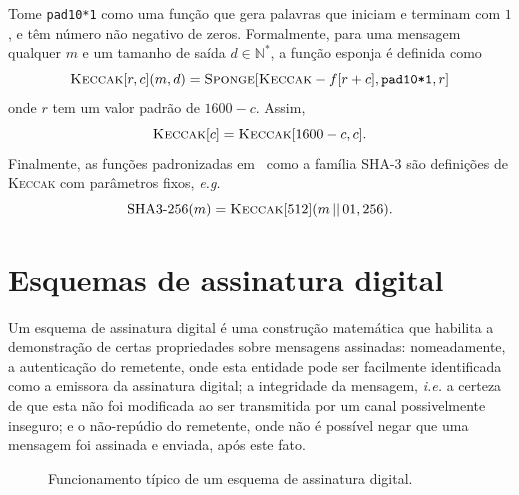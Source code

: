 \documentclass{ufsctex/ufsctex}
\newcommand{\pk}{\mathcal{P}_k}
\newcommand{\sk}{\mathcal{S}_k}
\newcommand{\concat}{\, \vert{} \vert{} \,}
\newcommand{\binwds}[1]{\{0, 1\}^{#1}}
\begin{document}
Tome \texttt{pad10*1} como uma função que gera palavras que iniciam e terminam
com $1$, e têm número não negativo de zeros. Formalmente, para uma mensagem
qualquer $m$ e um tamanho de saída $d \in \mathbb{N}^{*}$, a função esponja é
definida como
\begin{equation}
  \textsc{Keccak}[r, c](m, d)
    = \textsc{Sponge}[\textsc{Keccak}-f[r + c], \texttt{pad10*1}, r]
\end{equation}
onde $r$ tem um valor padrão de $1600 - c$. Assim,
\begin{equation}
  \textsc{Keccak}[c] = \textsc{Keccak}[1600 - c, c].
\end{equation}
Finalmente, as funções padronizadas em~\cite{Dworkin2015} como a família SHA-3
são definições de \textsc{Keccak} com parâmetros fixos, \emph{e.g.}
\begin{equation}
  \text{SHA3-}256(m) = \textsc{Keccak}[512](m \concat 01, 256).
\end{equation}\simbolo{$\concat$}{Concatenação de palavras}

\section{Esquemas de assinatura digital}\label{section:digitalsig}

Um esquema de assinatura digital é uma construção matemática que habilita a
demonstração de certas propriedades sobre mensagens assinadas: nomeadamente, a
autenticação do remetente, onde esta entidade pode ser facilmente identificada
como a emissora da assinatura digital; a integridade da mensagem, \emph{i.e.} a
certeza de que esta não foi modificada ao ser transmitida por um canal
possivelmente inseguro; e o não-repúdio do remetente, onde não é possível negar
que uma mensagem foi assinada e enviada, após este fato.

\begin{figure}
  \centering
  \caption{Funcionamento típico de um
    esquema de assinatura digital.}\label{fig:2}
\end{figure}
\end{document}
